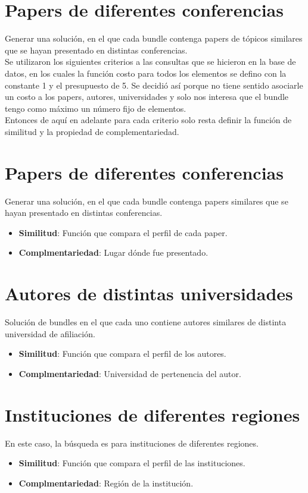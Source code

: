 \section{Papers de diferentes conferencias}\label{bus:papSimDisLug}
Generar una solución, en el que cada bundle contenga papers de tópicos similares que se hayan presentado en distintas conferencias.\\

Se utilizaron los siguientes criterios a las consultas que se hicieron en la base de datos, en los cuales la función costo para todos los elementos se defino con la constante 1 y el presupuesto de 5. Se decidió así porque no tiene sentido asociarle un costo a los papers, autores, universidades y solo nos interesa que el bundle tengo como máximo un número fijo de elementos. \\
Entonces de aquí en adelante para cada criterio solo resta definir la función de similitud y la propiedad de complementariedad.

\section{Papers de diferentes conferencias}\label{bus:papSimDisLug}
Generar una solución, en el que cada bundle contenga papers similares que se hayan presentado en distintas conferencias.\\

\begin{itemize}
  \item \textbf{Similitud}: Función que compara el perfil de cada paper.
  \item \textbf{Complmentariedad}: Lugar dónde fue presentado.
\end{itemize}

\section{Autores de distintas universidades}
Solución de bundles en el que cada uno contiene autores similares de distinta universidad de afiliación.\\
\begin{itemize}
  \item \textbf{Similitud}: Función que compara el perfil de los autores.
  \item \textbf{Complmentariedad}: Universidad de pertenencia del autor.
\end{itemize}

\section{Instituciones de diferentes regiones}
En este caso, la búsqueda es para instituciones de diferentes regiones. 
\begin{itemize}
  \item \textbf{Similitud}: Función que compara el perfil de las instituciones.
  \item \textbf{Complmentariedad}: Región de la institución.
\end{itemize}

